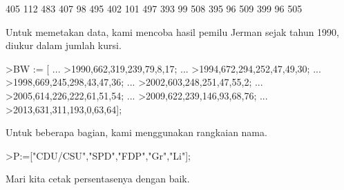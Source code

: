\documentclass{article}
\begin{document}
\begin{eulernotebook}
\begin{eulercomment}
\begin{eulercomment}
\begin{euleroutput}
            405           112           483 
            407            98           495 
            402           101           497 
            393            99           508 
            395            96           509 
            399            96           505 
\end{euleroutput}
\begin{eulercomment}
Untuk memetakan data, kami mencoba hasil pemilu Jerman sejak tahun
1990, diukur dalam jumlah kursi.
\end{eulercomment}
\begin{eulerprompt}
>BW := [ ...
>1990,662,319,239,79,8,17; ...
>1994,672,294,252,47,49,30; ...
>1998,669,245,298,43,47,36; ...
>2002,603,248,251,47,55,2; ...
>2005,614,226,222,61,51,54; ...
>2009,622,239,146,93,68,76; ...
>2013,631,311,193,0,63,64];
\end{eulerprompt}
\begin{eulercomment}
Untuk beberapa bagian, kami menggunakan rangkaian nama.
\end{eulercomment}
\begin{eulerprompt}
>P:=["CDU/CSU","SPD","FDP","Gr","Li"];
\end{eulerprompt}
\begin{eulercomment}
Mari kita cetak persentasenya dengan baik.


\end{eulercomment}
\end{eulercomment}
\end{eulercomment}
\end{eulernotebook}
\end{document}
